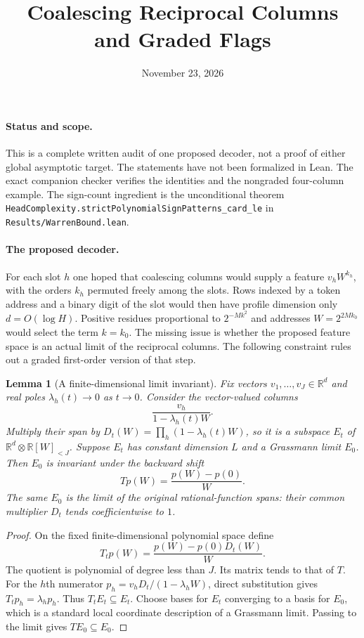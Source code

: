 \documentclass[11pt]{article}
\title{Coalescing Reciprocal Columns and Graded Flags}
\author{}
\date{November 23, 2026}
\newtheorem{lemma}[theorem]{Lemma}
\begin{document}
\maketitle

\paragraph{Status and scope.}
This is a complete written audit of one proposed decoder, not a proof of
either global asymptotic target. The statements have not been formalized
in Lean. The exact companion checker verifies the identities and the
nongraded four-column example. The sign-count ingredient is the
unconditional theorem
\texttt{HeadComplexity.strictPolynomialSignPatterns\_card\_le} in
\texttt{Results/WarrenBound.lean}.

\paragraph{The proposed decoder.}
For each slot $h$ one hoped that coalescing columns would supply a feature
$v_h W^{k_h}$, with the orders $k_h$ permuted freely among the slots.
Rows indexed by a token address and a binary digit of the slot would then
have profile dimension only $d=O(\log H)$. Positive residues proportional
to $2^{-Mk^2}$ and addresses $W=2^{2Mk_0}$ would select the term $k=k_0$.
The missing issue is whether the proposed feature space is an actual
limit of the reciprocal columns. The following constraint rules out a
graded first-order version of that step.

\begin{lemma}[A finite-dimensional limit invariant]
Fix vectors $v_1,\ldots,v_J\in\mathbb R^d$ and real poles
$\lambda_h(t)\to0$ as $t\to0$. Consider the vector-valued columns
\[
                 \frac{v_h}{1-\lambda_h(t)W}.
\]
Multiply their span by
$D_t(W)=\prod_h(1-\lambda_h(t)W)$, so it is a subspace $E_t$ of
$\mathbb R^d\otimes\mathbb R[W]_{<J}$.
Suppose $E_t$ has constant dimension $L$ and a Grassmann limit $E_0$.
Then $E_0$ is invariant under the backward shift
\[
                 T p(W)=\frac{p(W)-p(0)}{W}.
\]
The same $E_0$ is the limit of the original rational-function spans:
their common multiplier $D_t$ tends coefficientwise to $1$.
\end{lemma}
\begin{proof}
On the fixed finite-dimensional polynomial space define
\[
          T_t p(W)=\frac{p(W)-p(0)D_t(W)}{W}.
\]
The quotient is polynomial of degree less than $J$. Its matrix tends
to that of $T$. For the $h$th numerator
$p_h=v_hD_t/(1-\lambda_hW)$, direct substitution gives
$T_t p_h=\lambda_h p_h$. Thus $T_tE_t\subseteq E_t$.
Choose bases for $E_t$ converging to a basis for $E_0$, which is a
standard local coordinate description of a Grassmann limit. Passing
to the limit gives $TE_0\subseteq E_0$.
\end{proof}
\end{document}
